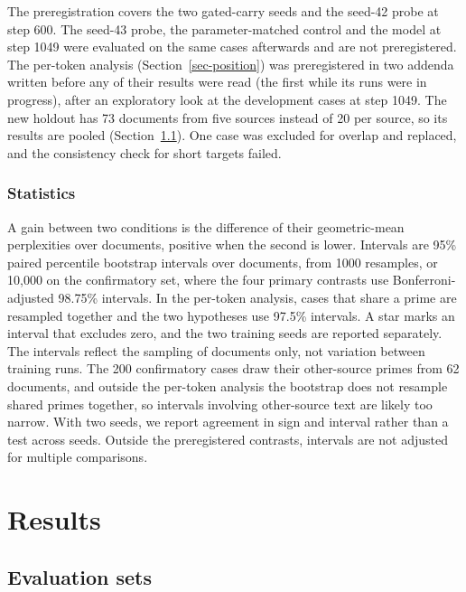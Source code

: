 \documentclass[10pt]{article} %
\begin{document}
The preregistration covers the two gated-carry seeds and the seed-42 probe at step 600. The seed-43 probe, the parameter-matched control and the model at step 1049 were evaluated on the same cases afterwards and are not preregistered. The per-token analysis (Section~\ref{sec-position}) was preregistered in two addenda written before any of their results were read (the first while its runs were in progress), after an exploratory look at the development cases at step 1049. The new holdout has 73 documents from five sources instead of 20 per source, so its results are pooled (Section~\ref{sec-evaldata}). One case was excluded for overlap and replaced, and the consistency check for short targets failed. 

\subsubsection{Statistics}

A gain between two conditions is the difference of their geometric-mean perplexities over documents, positive when the second is lower. Intervals are 95\% paired percentile bootstrap intervals \citep{efron1993bootstrap} over documents, from 1000 resamples, or 10{,}000 on the confirmatory set, where the four primary contrasts use Bonferroni-adjusted \citep{dunn1961multiple} 98.75\% intervals. In the per-token analysis, cases that share a prime are resampled together and the two hypotheses use 97.5\% intervals. A star marks an interval that excludes zero, and the two training seeds are reported separately. The intervals reflect the sampling of documents only, not variation between training runs. The 200 confirmatory cases draw their other-source primes from 62 documents, and outside the per-token analysis the bootstrap does not resample shared primes together, so intervals involving other-source text are likely too narrow. With two seeds, we report agreement in sign and interval rather than a test across seeds. Outside the preregistered contrasts, intervals are not adjusted for multiple comparisons.

\section{Results}

\subsection{Evaluation sets}
\label{sec-evaldata}
\end{document}
